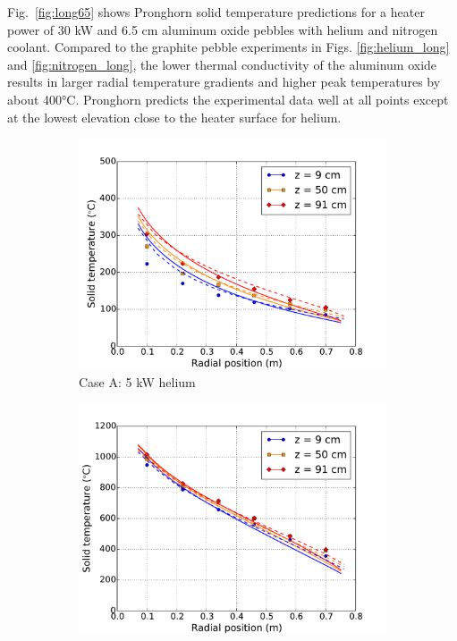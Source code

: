 Fig.\ \ref{fig:long65} shows Pronghorn solid temperature predictions for a heater power of 30 \si{\kilo\watt} and 6.5 \si{\centi\meter} aluminum oxide pebbles with helium and nitrogen coolant. Compared to the graphite pebble experiments in Figs. \ref{fig:helium_long} and \ref{fig:nitrogen_long}, the lower thermal conductivity of the aluminum oxide results in larger radial temperature gradients and higher peak temperatures by about 400\si{\celsius}. Pronghorn predicts the experimental data well at all points except at the lowest elevation close to the heater surface for helium.

\begin{figure}[h!]
    \begin{subfigure}{0.5\linewidth}
        \centering
        \includegraphics[height=0.75\linewidth]{figs/exp_total_A.pdf}
       \caption{Case A: 5 \si{\kilo\watt} helium}
       \label{fig:helium_longa}
    \end{subfigure}
    \begin{subfigure}{0.5\linewidth}
        \centering
        \includegraphics[height=0.75\linewidth]{figs/exp_total_F.pdf}

\end{subfigure}
\end{figure}
